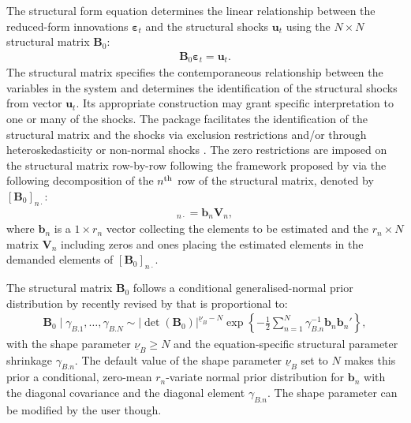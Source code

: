 \documentclass[
  nojss]{jss}
\begin{document}
The structural form equation determines the linear relationship between
the reduced-form innovations \(\boldsymbol{\varepsilon}_t\) and the
structural shocks \(\mathbf{u}_t\) using the \(N\times N\) structural
matrix \(\mathbf{B}_0\): \begin{align}
\mathbf{B}_0\boldsymbol{\varepsilon}_t = \mathbf{u}_t.\label{eq:sf}
\end{align} The structural matrix specifies the contemporaneous
relationship between the variables in the system and determines the
identification of the structural shocks from vector \(\mathbf{u}_t\).
Its appropriate construction may grant specific interpretation to one or
many of the shocks. The package  facilitates the
identification of the structural matrix and the shocks via exclusion
restrictions \citep[see][Chapter 8]{KL2017} and/or through
heteroskedasticity or non-normal shocks \citep[][Chapter 14]{KL2017}.
The zero restrictions are imposed on the structural matrix row-by-row
following the framework proposed by \cite{WaggonerZha2003} via the
following decomposition of the \(n\textsuperscript{th}\) row of the
structural matrix, denoted by \([\mathbf{B}_0]_{n\cdot}\): \begin{align}
[\mathbf{B}_0]_{n\cdot} = \mathbf{b}_n\mathbf{V}_n, \label{eq:restrictions}
\end{align} where \(\mathbf{b}_n\) is a \(1\times r_n\) vector
collecting the elements to be estimated and the \(r_n\times N\) matrix
\(\mathbf{V}_n\) including zeros and ones placing the estimated elements
in the demanded elements of \([\mathbf{B}_0]_{n\cdot}\).

The structural matrix \(\mathbf{B}_0\) follows a conditional
generalised-normal prior distribution by \cite{WaggonerZha2003} recently
revised by \cite{Arias2018} that is proportional to: \begin{align}
\mathbf{B}_0\mid\gamma_{B.1},\dots,\gamma_{B.N} \sim |\det(\mathbf{B}_0)|^{\underline{\nu}_B - N} \exp\left\{-\frac{1}{2} \sum_{n=1}^{N} \gamma_{B.n}^{-1} \mathbf{b}_n\mathbf{b}_n' \right\},
\end{align} with the shape parameter \(\underline{\nu}_B \geq N\) and
the equation-specific structural parameter shrinkage \(\gamma_{B.n}\).
The default value of the shape parameter \(\underline{\nu}_B\) set to
\(N\) makes this prior a conditional, zero-mean \(r_n\)-variate normal
prior distribution for \(\mathbf{b}_n\) with the diagonal covariance and
the diagonal element \(\gamma_{B.n}\). The shape parameter can be
modified by the user though.
\end{document}
